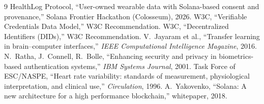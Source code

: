 \documentclass[10pt,twocolumn]{article}
\begin{document}
\begin{thebibliography}{9}
\footnotesize
{} HealthLog Protocol, ``User-owned wearable data with
Solana-based consent and provenance,'' Solana Frontier Hackathon (Colosseum),
2026.
 W3C, ``Verifiable Credentials Data Model,'' W3C Recommendation.
 W3C, ``Decentralized Identifiers (DIDs),'' W3C Recommendation.
 V.\ Jayaram et al., ``Transfer learning in brain--computer
interfaces,'' \emph{IEEE Computational Intelligence Magazine}, 2016.
 N.\ Ratha, J.\ Connell, R.\ Bolle, ``Enhancing security and
privacy in biometrics-based authentication systems,'' \emph{IBM Systems
Journal}, 2001.
 Task Force of ESC/NASPE, ``Heart rate variability: standards of
measurement, physiological interpretation, and clinical use,'' \emph{Circulation},
1996.
 A.\ Yakovenko, ``Solana: A new architecture for a high
performance blockchain,'' whitepaper, 2018.
\end{thebibliography}
\end{document}
